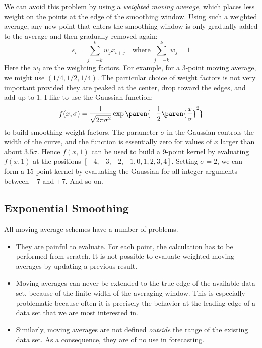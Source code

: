 We can avoid this problem by using a \emph{weighted moving average}, 
which places less weight on the points at the edge of the smoothing
window. Using such a weighted average, any new point that enters the
smoothing window is only gradually added to the average and then
gradually removed again:
%
\[ 
s_i = \sum_{j=-k}^k w_j x_{i+j} 
      \quad \text{where } \sum_{j=-k}^k w_j = 1
\]
%
Here the $w_j$ are the weighting factors. For example, for a 3-point
moving average, we might use $( 1/4, 1/2, 1/4 )$. The particular choice
of weight factors is not very important provided they are peaked at
the center, drop toward the edges, and add up to $1$. I like to use
the Gaussian function:
%
\[ 
f(x,\sigma) = \frac{1}{\sqrt{2 \pi \sigma^2}} 
              \exp \paren{- \frac{1}{2} \paren{ \frac{x}{\sigma} }^2}
\]
%
to build smoothing weight factors. The parameter $\sigma$ in the
Gaussian controls the width of the curve, and the function is
essentially zero for values of $x$ larger than about $3.5 \sigma$.
Hence $f(x,1)$ can be used to build a 9-point kernel by evaluating
$f(x,1)$ at the positions $[-4,-3,-2,-1,0,1,2,3,4]$. Setting
$\sigma=2$, we can form a 15-point kernel by evaluating the Gaussian
for all integer arguments between $-7$ and $+7$. And so on.


\subsection{Exponential Smoothing}

 
All moving-average schemes have a number of problems.

\begin{itemize}
\item They are painful to evaluate. For each point, the calculation
  has to be performed from scratch. It is not possible to evaluate
  weighted moving averages by updating a previous result.

\item Moving averages can never be extended to the true edge of the
  available data set, because of the finite width of the averaging
  window. This is especially problematic because often it is precisely
  the behavior at the leading edge of a data set that we are most
  interested in.

\item Similarly, moving averages are not defined \emph{outside} the
  range of the existing data set.  As a consequence, they are of no
  use in forecasting.
\end{itemize}

